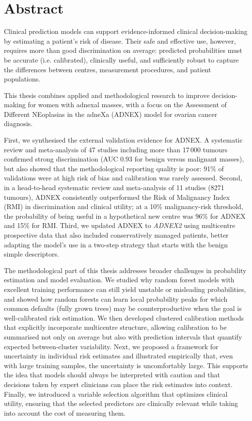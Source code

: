 \chapter*{Abstract}


Clinical prediction models can support evidence-informed clinical decision-making by estimating a patient's risk of disease. Their safe and effective use, however, requires more than good discrimination on average: predicted probabilities must be accurate (i.e. calibrated), clinically useful, and sufficiently robust to capture the differences between centres, measurement procedures, and patient populations.


This thesis combines applied and methodological research to improve decision-making for women with adnexal masses, with a focus on the Assessment of Different NEoplasias in the adneXa (\gls{ADNEX}) model for ovarian cancer diagnosis.

First, we synthesised the external validation evidence for \gls{ADNEX}. A systematic review and meta-analysis of 47 studies including more than 17\,000 tumours confirmed strong discrimination (AUC 0.93 for benign versus malignant masses), but also showed that the methodological reporting quality is poor: 91\% of validations were at high risk of bias and calibration was rarely assessed. Second, in a head-to-head systematic review and meta-analysis of 11 studies (8271 tumours), \gls{ADNEX} consistently outperformed the Risk of Malignancy Index (\gls{RMI}) in discrimination and clinical utility; at a 10\% malignancy-risk threshold, the probability of being useful in a hypothetical new centre was 96\% for \gls{ADNEX} and 15\% for \gls{RMI}. Third, we updated \gls{ADNEX} to \emph{ADNEX2} using multicentre prospective data that also included conservatively managed patients, better adapting the model's use in a two-step strategy that starts with the benign simple descriptors.

The methodological part of this thesis addresses broader challenges in probability estimation and model evaluation. We studied why random forest models with excellent training performance can still yield unstable or misleading probabilities, and showed how random forests can learn local probability peaks for which common defaults (fully grown trees) may be counterproductive when the goal is well-calibrated risk estimation. We then developed clustered calibration methods that explicitly incorporate multicentre structure, allowing calibration to be summarised not only on average but also with prediction intervals that quantify expected between-cluster variability. Next, we proposed a framework for uncertainty in individual risk estimates and illustrated empirically that, even with large training samples, the uncertainty is uncomfortably large. This supports the idea that models should always be interpreted with caution and that decisions taken by expert clinicians can place the risk estimates into context. Finally, we introduced a variable selection algorithm that optimizes clinical utility, ensuring that the selected predictors are clinically relevant while taking into account the cost of measuring them.


